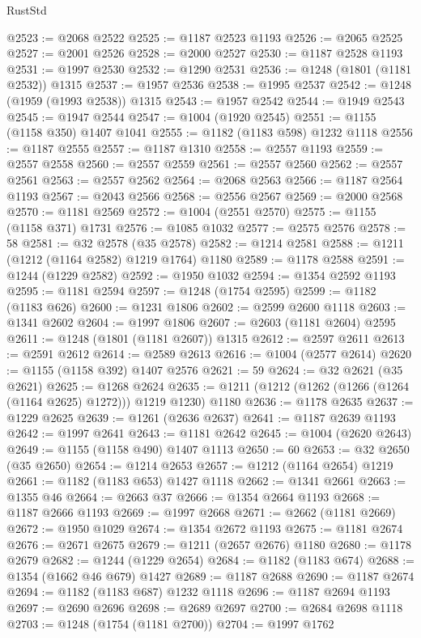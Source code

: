 \begin{lexlean}{RustStd}
\begin{coremodule}
@2523 := @2068 @2522
@2525 := @1187 @2523 @1193
@2526 := @2065 @2525
@2527 := @2001 @2526
@2528 := @2000 @2527
@2530 := @1187 @2528 @1193
@2531 := @1997 @2530
@2532 := @1290 @2531
@2536 := @1248 (@1801 (@1181 @2532)) @1315
@2537 := @1957 @2536
@2538 := @1995 @2537
@2542 := @1248 (@1959 (@1993 @2538)) @1315
@2543 := @1957 @2542
@2544 := @1949 @2543
@2545 := @1947 @2544
@2547 := @1004 (@1920 @2545)
@2551 := @1155 (@1158 @350) @1407 @1041
@2555 := @1182 (@1183 @598) @1232 @1118
@2556 := @1187 @2555
@2557 := @1187 @1310
@2558 := @2557 @1193
@2559 := @2557 @2558
@2560 := @2557 @2559
@2561 := @2557 @2560
@2562 := @2557 @2561
@2563 := @2557 @2562
@2564 := @2068 @2563
@2566 := @1187 @2564 @1193
@2567 := @2043 @2566
@2568 := @2556 @2567
@2569 := @2000 @2568
@2570 := @1181 @2569
@2572 := @1004 (@2551 @2570)
@2575 := @1155 (@1158 @371) @1731
@2576 := @1085 @1032
@2577 := @2575 @2576
@2578 := 58
@2581 := @32 @2578 (@35 @2578)
@2582 := @1214 @2581
@2588 := @1211 (@1212 (@1164 @2582) @1219 @1764) @1180
@2589 := @1178 @2588
@2591 := @1244 (@1229 @2582)
@2592 := @1950 @1032
@2594 := @1354 @2592 @1193
@2595 := @1181 @2594
@2597 := @1248 (@1754 @2595)
@2599 := @1182 (@1183 @626)
@2600 := @1231 @1806
@2602 := @2599 @2600 @1118
@2603 := @1341 @2602
@2604 := @1997 @1806
@2607 := @2603 (@1181 @2604) @2595
@2611 := @1248 (@1801 (@1181 @2607)) @1315
@2612 := @2597 @2611
@2613 := @2591 @2612
@2614 := @2589 @2613
@2616 := @1004 (@2577 @2614)
@2620 := @1155 (@1158 @392) @1407 @2576
@2621 := 59
@2624 := @32 @2621 (@35 @2621)
@2625 := @1268 @2624
@2635 := @1211 (@1212 (@1262 (@1266 (@1264 (@1164 @2625) @1272))) @1219 @1230) @1180
@2636 := @1178 @2635
@2637 := @1229 @2625
@2639 := @1261 (@2636 @2637)
@2641 := @1187 @2639 @1193
@2642 := @1997 @2641
@2643 := @1181 @2642
@2645 := @1004 (@2620 @2643)
@2649 := @1155 (@1158 @490) @1407 @1113
@2650 := 60
@2653 := @32 @2650 (@35 @2650)
@2654 := @1214 @2653
@2657 := @1212 (@1164 @2654) @1219
@2661 := @1182 (@1183 @653) @1427 @1118
@2662 := @1341 @2661
@2663 := @1355 @46
@2664 := @2663 @37
@2666 := @1354 @2664 @1193
@2668 := @1187 @2666 @1193
@2669 := @1997 @2668
@2671 := @2662 (@1181 @2669)
@2672 := @1950 @1029
@2674 := @1354 @2672 @1193
@2675 := @1181 @2674
@2676 := @2671 @2675
@2679 := @1211 (@2657 @2676) @1180
@2680 := @1178 @2679
@2682 := @1244 (@1229 @2654)
@2684 := @1182 (@1183 @674)
@2688 := @1354 (@1662 @46 @679) @1427
@2689 := @1187 @2688
@2690 := @1187 @2674
@2694 := @1182 (@1183 @687) @1232 @1118
@2696 := @1187 @2694 @1193
@2697 := @2690 @2696
@2698 := @2689 @2697
@2700 := @2684 @2698 @1118
@2703 := @1248 (@1754 (@1181 @2700))
@2704 := @1997 @1762

\end{coremodule}
\end{lexlean}
